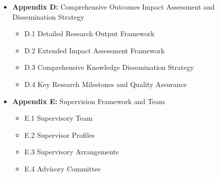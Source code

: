 \documentclass[12pt,a4paper]{article}
\begin{document}
\begin{itemize}[leftmargin=*, itemsep=0.3em]
    \item \textbf{Appendix D:} Comprehensive Outcomes Impact Assessment and Dissemination Strategy
    \begin{itemize}[leftmargin=*]
        \item D.1 Detailed Research Output Framework
        \item D.2 Extended Impact Assessment Framework
        \item D.3 Comprehensive Knowledge Dissemination Strategy
        \item D.4 Key Research Milestones and Quality Assurance
    \end{itemize}
    
    \item \textbf{Appendix E:} Supervision Framework and Team
    \begin{itemize}[leftmargin=*]
        \item E.1 Supervisory Team
        \item E.2 Supervisor Profiles
        \item E.3 Supervisory Arrangements
        \item E.4 Advisory Committee
    \end{itemize}
\end{itemize}
\end{document}
